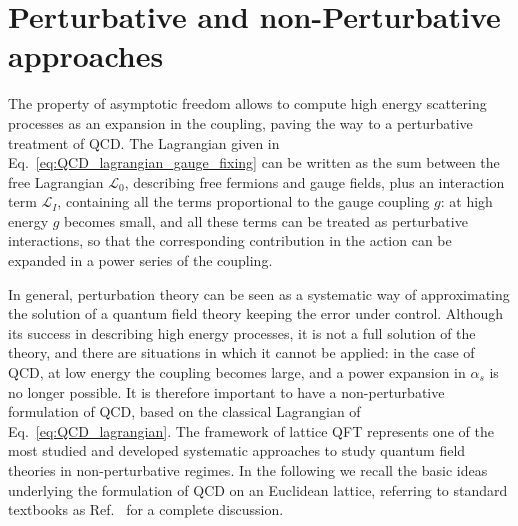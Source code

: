 \section{Perturbative and non-Perturbative approaches}
The property of asymptotic freedom allows to compute high energy scattering processes as
an expansion in the coupling, paving the way to a perturbative treatment of QCD.
The Lagrangian given in Eq.~\eqref{eq:QCD_lagrangian_gauge_fixing}
can be written as the sum between the free Lagrangian $\mathcal{L}_0$, describing free fermions and gauge fields, 
plus an interaction term $\mathcal{L}_I$, containing all the terms proportional to the gauge coupling $g$:
at high energy $g$ becomes small, and all these terms 
can be treated as perturbative interactions, so that the corresponding
contribution in the action can be expanded in a power series of the coupling.

%
In general, perturbation theory can be seen as a systematic way of approximating the solution 
of a quantum field theory keeping the error under control.
Although its success in describing high energy processes, it is not a full solution of the theory, 
and there are situations in which it cannot be applied: in the case of QCD, at low energy the coupling
becomes large, and a power expansion in $\alpha_s$ is no longer possible. 
It is therefore important to have a non-perturbative formulation of QCD, based on the classical Lagrangian 
of Eq.~\eqref{eq:QCD_lagrangian}.
The framework of lattice QFT represents one of the most studied and developed systematic approaches to study quantum
field theories in non-perturbative regimes. In the following we recall the basic ideas underlying the formulation of 
QCD on an Euclidean lattice, referring to standard textbooks as Ref.~\cite{smit_2002} for a complete discussion.

